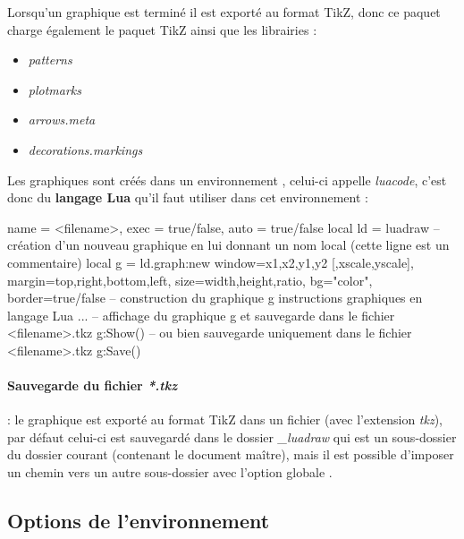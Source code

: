 Lorsqu'un graphique est terminé il est exporté au format TikZ, donc ce paquet charge également le paquet TikZ ainsi que les librairies :
\begin{itemize}
\item\emph{patterns}
\item\emph{plotmarks}
\item\emph{arrows.meta}
\item\emph{decorations.markings}
\end{itemize}

Les graphiques sont créés dans un environnement \luadrawenv, celui-ci appelle \emph{luacode}, c'est donc du \textbf{langage Lua} qu'il faut utiliser dans cet environnement :

\begin{TeXcode}
\begin{luadraw}{ name = <filename>, exec = true/false, auto = true/false }
local ld = luadraw
-- création d'un nouveau graphique en lui donnant un nom local (cette ligne est un commentaire)
local g = ld.graph:new{ window={x1,x2,y1,y2 [,xscale,yscale]}, margin={top,right,bottom,left},
                     size={width,height,ratio}, bg="color", border=true/false }
-- construction du graphique g
    instructions graphiques en langage Lua ...
-- affichage du graphique g et sauvegarde dans le fichier <filename>.tkz
g:Show()
-- ou bien sauvegarde uniquement dans le fichier <filename>.tkz
g:Save()
\end{luadraw}
\end{TeXcode}

\paragraph{Sauvegarde du fichier \emph{*.tkz}} : le graphique est exporté au format TikZ dans un fichier (avec l'extension \emph{tkz}), par défaut celui-ci est sauvegardé dans le dossier \emph{\_luadraw} qui est un sous-dossier du dossier courant (contenant le document maître), mais il est possible d'imposer un chemin vers un autre sous-dossier avec l'option globale .

\subsection{Options de l'environnement \luadrawenv}

